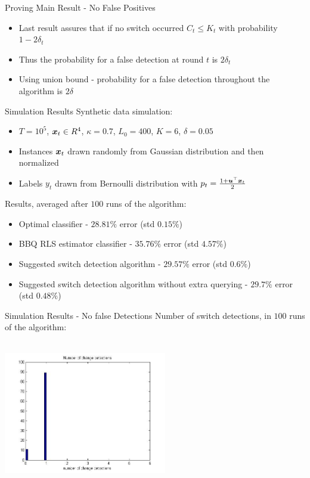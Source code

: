 \documentclass{beamer}
\begin{document}
\begin{frame}{Proving Main Result - No False Positives}
\begin{itemize}
\item Last result assures that if no switch occurred $C_t\leq K_t$ with probability $1-2\delta_t$\newline
\item Thus  the probability for a false detection at round $t$ is $2\delta_t$\newline
\item Using union bound - probability for a false detection throughout the algorithm is $2\delta$\newline


\end{itemize}
\end{frame}

\begin{frame}{Simulation Results}
Synthetic data simulation:\newline
\begin{itemize}
\item $T=10^5$, ${\boldsymbol{x}}_{t}\in R^4$, $\kappa=0.7$, $L_0=400$, $K=6$, $\delta=0.05$
\item Instances ${\boldsymbol{x}}_{t}$ drawn randomly from Gaussian distribution and then normalized
\item Labels $y_t$ drawn from Bernoulli distribution with $p_t=\frac{1+{{\boldsymbol{u}}}^{\top}{\boldsymbol{x}}_{t}}{2}$\newline
\end{itemize}
Results, averaged after $100$ runs of the algorithm:\newline
\begin{itemize}
\item Optimal classifier - $28.81\%$ error (std $0.15\%$)
\item BBQ RLS estimator classifier - $35.76\%$ error (std $4.57\%$)
\item Suggested switch detection algorithm - $29.57\%$ error (std $0.6\%$)
\item Suggested switch detection algorithm without extra querying - $29.7\%$ error (std $0.48\%$)
\end{itemize}
\end{frame}

\begin{frame}{Simulation Results - No false Detections}
Number of switch detections, in $100$ runs of the algorithm:
\begin{center}
\includegraphics[height=2.5in,width=2.8in]{Ndet_clas_alg2_ver1_small.jpg}
\end{center}
\end{frame}
\end{document}
